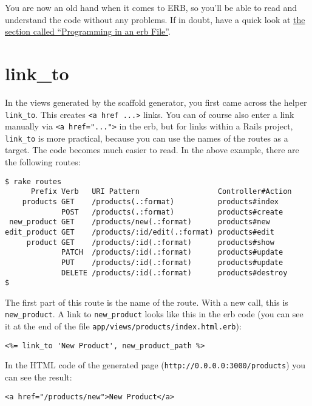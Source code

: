 \documentclass[a4paper]{book}
\newcommand{\chap}[1]{\newpage\thispagestyle{empty}\chapter{#1}\label{chap:\thechapter}}
\begin{document}
You are now an old hand when it comes to ERB, so you'll be able to read and understand the code without any problems. If in doubt, have a quick look at \hyperref[erb-programmieren]{the section called “Programming in an erb File”}.

\chap{link\_to}\label{linkux5fto}

In the views generated by the scaffold generator, you first came across the helper \texttt{link\_to}. This creates \texttt{\textless{}a href         ...\textgreater{}} links. You can of course also enter a link manually via \texttt{\textless{}a href="..."\textgreater{}} in the erb, but for links within a Rails project, \texttt{link\_to} is more practical, because you can use the names of the routes as a target. The code becomes much easier to read. In the above example, there are the following routes:

\begin{shaded}\begin{verbatim}
$ rake routes
      Prefix Verb   URI Pattern                  Controller#Action
    products GET    /products(.:format)          products#index
             POST   /products(.:format)          products#create
 new_product GET    /products/new(.:format)      products#new
edit_product GET    /products/:id/edit(.:format) products#edit
     product GET    /products/:id(.:format)      products#show
             PATCH  /products/:id(.:format)      products#update
             PUT    /products/:id(.:format)      products#update
             DELETE /products/:id(.:format)      products#destroy
$
\end{verbatim}\end{shaded}

The first part of this route is the name of the route. With a new call, this is \texttt{new\_product}. A link to \texttt{new\_product} looks like this in the erb code (you can see it at the end of the file \texttt{app/views/products/index.html.erb}):

\begin{shaded}\begin{verbatim}
<%= link_to 'New Product', new_product_path %>
\end{verbatim}\end{shaded}

In the HTML code of the generated page (\texttt{http://0.0.0.0:3000/products}) you can see the result:

\begin{shaded}\begin{verbatim}
<a href="/products/new">New Product</a>
\end{verbatim}\end{shaded}
\end{document}
